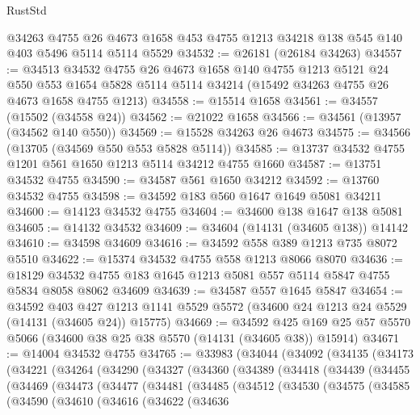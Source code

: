 \begin{lexlean}{RustStd}
\begin{coremodule}
    @34263
    @4755
    @26
    @4673
    @1658
    @453
    @4755
    @1213
    @34218
    @138
    @545
    @140
    @403
    @5496
    @5114
    @5114
    @5529
@34532 := @26181 (@26184 @34263)
@34557 := @34513
    @34532
    @4755
    @26
    @4673
    @1658
    @140
    @4755
    @1213
    @5121
    @24
    @550
    @553
    @1654
    @5828
    @5114
    @5114
    @34214
    (@15492 @34263 @4755 @26 @4673 @1658 @4755 @1213)
@34558 := @15514 @1658
@34561 := @34557 (@15502 (@34558 @24))
@34562 := @21022 @1658
@34566 := @34561 (@13957 (@34562 @140 @550))
@34569 := @15528 @34263 @26 @4673
@34575 := @34566 (@13705 (@34569 @550 @553 @5828 @5114))
@34585 := @13737 @34532 @4755 @1201 @561 @1650 @1213 @5114 @34212 @4755 @1660
@34587 := @13751 @34532 @4755
@34590 := @34587 @561 @1650 @34212
@34592 := @13760 @34532 @4755
@34598 := @34592 @183 @560 @1647 @1649 @5081 @34211
@34600 := @14123 @34532 @4755
@34604 := @34600 @138 @1647 @138 @5081
@34605 := @14132 @34532
@34609 := @34604 (@14131 (@34605 @138)) @14142
@34610 := @34598 @34609
@34616 := @34592 @558 @389 @1213 @735 @8072 @5510
@34622 := @15374 @34532 @4755 @558 @1213 @8066 @8070
@34636 := @18129 @34532 @4755 @183 @1645 @1213 @5081 @557 @5114 @5847 @4755 @5834 @8058 @8062 @34609
@34639 := @34587 @557 @1645 @5847
@34654 := @34592
    @403
    @427
    @1213
    @1141
    @5529
    @5572
    (@34600 @24 @1213 @24 @5529 (@14131 (@34605 @24)) @15775)
@34669 := @34592
    @425
    @169
    @25
    @57
    @5570
    @5066
    (@34600 @38 @25 @38 @5570 (@14131 (@34605 @38)) @15914)
@34671 := @14004 @34532 @4755
@34765 := @33983
    (@34044
      (@34092
        (@34135
          (@34173
            (@34221
              (@34264
                (@34290
                  (@34327
                    (@34360
                      (@34389
                        (@34418
                          (@34439
                            (@34455
                              (@34469
                                (@34473
                                  (@34477
                                    (@34481
                                      (@34485
                                        (@34512
                                          (@34530
                                            (@34575
                                              (@34585
                                                (@34590
                                                  (@34610
                                                    (@34616
                                                      (@34622
                                                        (@34636

\end{coremodule}
\end{lexlean}
